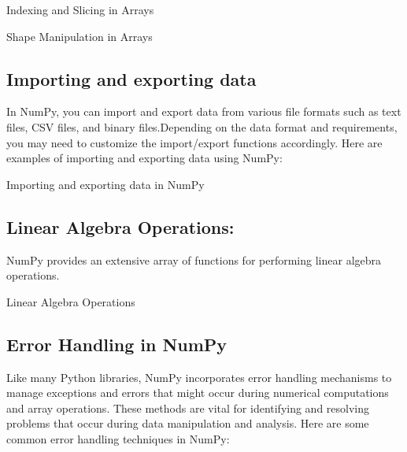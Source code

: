 \begin{code}[h!]
	    
	
	\caption{Indexing and Slicing in Arrays}
	
\end{code}

\begin{code}[h!]
	    
	
	\caption{Shape Manipulation in Arrays}
	
\end{code}

\subsection{Importing and exporting data}

In NumPy, you can import and export data from various file formats such as text files, CSV files, and binary files.Depending on the data format and requirements, you may need to customize the import/export functions accordingly. Here are examples of importing and exporting data using NumPy:
\begin{code}[h!]
	    
	
	\caption{Importing and exporting data in NumPy}
	
\end{code}

\subsection{Linear Algebra Operations:}

NumPy provides an extensive array of functions for performing linear algebra operations.
\begin{code}[h!]
	    
	
	\caption{Linear Algebra Operations}
\end{code}

\subsection{Error Handling in NumPy}

Like many Python libraries, NumPy incorporates error handling mechanisms to manage exceptions and errors that might occur during numerical computations and array operations. These methods are vital for identifying and resolving problems that occur during data manipulation and analysis. Here are some common error handling techniques in NumPy:

